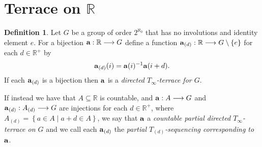 \documentclass[11pt]{amsart}
\theoremstyle{definition}
\newtheorem*{definition}{Definition}
\theoremstyle{remark}
\newcommand{\R}{\mathbb{R}}
\newcommand{\st}{\; | \;}
\newcommand{\set}[2]{\left\{#1\st #2 \right\}}
\newcommand{\To}{\longrightarrow}
\renewcommand{\a}{\textup{\textbf{a}}}
\begin{document}
\section*{Terrace on $\R$}
\begin{definition}
Let $G$ be a group of order $2^{\aleph_0}$ that has no involutions and identity element $e$. For a bijection $\a:\R \To G$ define a function $\a_{(d)}: \R \To G \setminus \{e\}$ for each $d \in \R^+$ by $$\a_{(d)}(i)=\a(i)^{-1}\a(i+d).$$ If each $\a_{(d)}$ is a bijection then $\a$ is a \emph{directed $T_\infty$-terrace for $G$}. 

If instead we have that $A \subseteq \R$ is countable, and $\a:A \To G$ and $\a_{(d)}:A_{(d)} \To G$ are injections for each $d \in \R^+$, where $A_{(d)}=\set{a \in A}{a+d \in A}$, we say that $\a$ a \emph{countable partial directed $T_\infty$-terrace on $G$} and we call each $\a_{(d)}$ the \emph{partial $T_{(d)}$-sequencing corresponding to $\a$}.
\end{definition}
\end{document}
